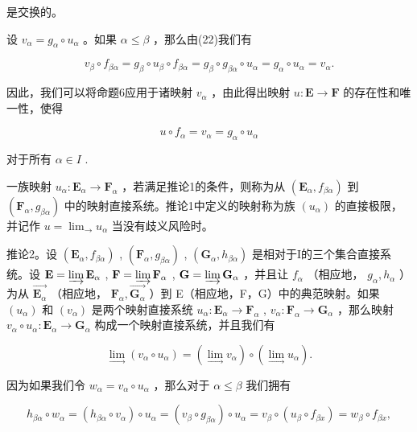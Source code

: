 是交换的。

设 \(v_{\alpha} = g_{\alpha} \circ u_{\alpha}\) 。如果 \(\alpha \leqslant \beta\) ，那么由(22)我们有

\[
v _ {\beta} \circ f _ {\beta \alpha} = g _ {\beta} \circ u _ {\beta} \circ f _ {\beta \alpha} = g _ {\beta} \circ g _ {\beta \alpha} \circ u _ {\alpha} = g _ {\alpha} \circ u _ {\alpha} = v _ {\alpha}.
\]

因此，我们可以将命题6应用于诸映射 \(v_{\alpha}\) ，由此得出映射 \(u: \mathbf{E} \to \mathbf{F}\) 的存在性和唯一性，使得

\[
u \circ f _ {\alpha} = v _ {\alpha} = g _ {\alpha} \circ u _ {\alpha}
\]

对于所有 \(\alpha \in I\) .

一族映射 \(u_{\alpha} \colon \mathbf{E}_{\alpha} \to \mathbf{F}_{\alpha}\) ，若满足推论1的条件，则称为从 \((\mathbf{E}_{\alpha}, f_{\beta \alpha})\) 到 \((\mathbf{F}_{\alpha}, g_{\beta \alpha})\) 中的映射直接系统。推论1中定义的映射称为族 \((u_{\alpha})\) 的直接极限，并记作 \(u = \lim_{\rightarrow} u_{\alpha}\) 当没有歧义风险时。

推论2。设 \((\mathbf{E}_{\alpha}, f_{\beta \alpha})\) , \((\mathbf{F}_{\alpha}, g_{\beta \alpha})\) , \((\mathbf{G}_{\alpha}, h_{\beta \alpha})\) 是相对于I的三个集合直接系统。设 \(\mathbf{E} = \varinjlim \mathbf{E}_{\alpha}\) , \(\mathbf{F} = \varinjlim \mathbf{F}_{\alpha}\) , \(\mathbf{G} = \varinjlim \mathbf{G}_{\alpha}\) ，并且让 \(f_{\alpha}\) （相应地， \(g_{\alpha}, h_{\alpha}\) ）为从 \(\overrightarrow{\mathbf{E}_{\alpha}}\) （相应地， \(\mathbf{F}_{\alpha}, \overrightarrow{\mathbf{G}_{\alpha}}\) ）到 E（相应地，F，G）中的典范映射。如果 \((u_{\alpha})\) 和 \((v_{\alpha})\) 是两个映射直接系统 \(u_{\alpha}: \mathbf{E}_{\alpha} \to \mathbf{F}_{\alpha}\) , \(v_{\alpha}: \mathbf{F}_{\alpha} \to \mathbf{G}_{\alpha}\) ，那么映射 \(v_{\alpha} \circ u_{\alpha}: \mathbf{E}_{\alpha} \to \mathbf{G}_{\alpha}\) 构成一个映射直接系统，并且我们有

\[
\lim _ {\rightarrow} \left(v _ {\alpha} \circ u _ {\alpha}\right) = (\lim _ {\rightarrow} v _ {\alpha}) \circ (\lim _ {\rightarrow} u _ {\alpha}).\tag{25}
\]

因为如果我们令 \(w_{\alpha} = v_{\alpha} \circ u_{\alpha}\) ，那么对于 \(\alpha \leqslant \beta\) 我们拥有

\[
h _ {\beta \alpha} \circ w _ {\alpha} = \left(h _ {\beta \alpha} \circ v _ {\alpha}\right) \circ u _ {\alpha} = \left(v _ {\beta} \circ g _ {\beta \alpha}\right) \circ u _ {\alpha} = v _ {\beta} \circ \left(u _ {\beta} \circ f _ {\beta x}\right) = w _ {\beta} \circ f _ {\beta x},
\]

